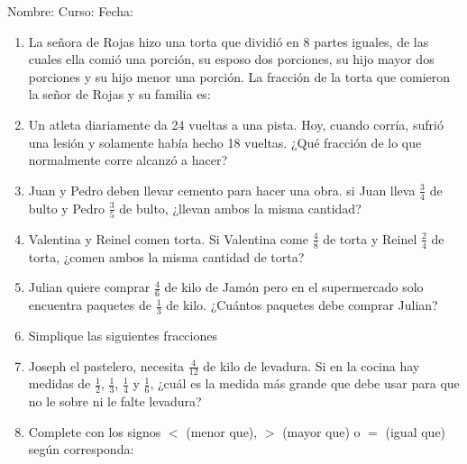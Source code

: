 \documentclass[letterpaper,fleqn]{article}
\newcommand{\LineaNombre}{%
\par
\vspace{\baselineskip}
Nombre:\hrulefill \; Curso: \underline{\hspace*{48pt}} \; Fecha: \underline{\hspace*{2.5cm}} \relax
\par}
\begin{document}
\LineaNombre
\begin{enumerate}
 \item La señora de Rojas hizo una torta que dividió en 8 partes iguales, de las cuales ella comió una porción, su esposo dos porciones, su hijo mayor dos porciones y su hijo menor una porción. La fracción de la torta que comieron la señor de Rojas y su familia es: \noanswer
 \item Un atleta diariamente da 24 vueltas a una pista. Hoy, cuando corría, sufrió una lesión y solamente había hecho 18 vueltas. ¿Qué  fracción de lo que normalmente corre alcanzó a hacer? \noanswer
\item Juan y Pedro deben llevar cemento para hacer una obra. si Juan lleva $\frac{3}{4}$ de bulto y Pedro $\frac{3}{5}$ de bulto, ¿llevan ambos la misma cantidad?\noanswer
\item Valentina y Reinel comen torta. Si Valentina come $\frac{4}{8}$ de torta y Reinel $\frac{2}{4}$ de torta, ¿comen ambos la misma cantidad de torta?\noanswer
\item Julian quiere comprar $\frac{4}{6}$ de kilo de Jamón pero en el supermercado solo encuentra  paquetes de $\frac{1}{3}$ de kilo. ¿Cuántos paquetes debe comprar Julian?\noanswer
\newpage
\item Simplique las siguientes fracciones
\begin{enumerate}
\end{enumerate}
\item Joseph el pastelero, necesita $\frac{4}{12}$ de kilo de levadura. Si en la cocina hay medidas de $\frac{1}{2}$, $\frac{1}{3}$, $\frac{1}{4}$ y $\frac{1}{6}$, ¿cu\'{a}l es la medida m\'{a}s grande que debe usar para que no le sobre ni le falte levadura?\noanswer
\item Complete con los signos $<$ (menor que), $>$ (mayor que) o $=$ (igual que) según corresponda:
\begin{enumerate}
\end{enumerate}
\end{enumerate}
\end{document}
